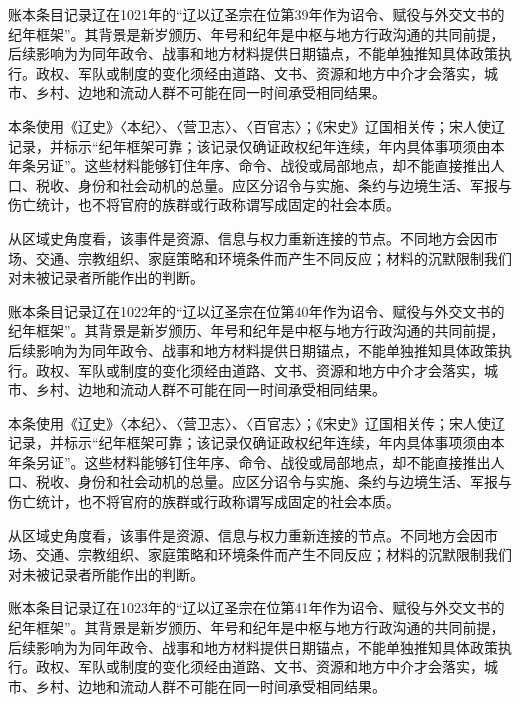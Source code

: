 账本条目记录辽在1021年的“辽以辽圣宗在位第39年作为诏令、赋役与外交文书的纪年框架”。其背景是新岁颁历、年号和纪年是中枢与地方行政沟通的共同前提，后续影响为为同年政令、战事和地方材料提供日期锚点，不能单独推知具体政策执行。政权、军队或制度的变化须经由道路、文书、资源和地方中介才会落实，城市、乡村、边地和流动人群不可能在同一时间承受相同结果。

本条使用《辽史》〈本纪〉、〈营卫志〉、〈百官志〉；《宋史》辽国相关传；宋人使辽记录，并标示“纪年框架可靠；该记录仅确证政权纪年连续，年内具体事项须由本年条另证”。这些材料能够钉住年序、命令、战役或局部地点，却不能直接推出人口、税收、身份和社会动机的总量。应区分诏令与实施、条约与边境生活、军报与伤亡统计，也不将官府的族群或行政称谓写成固定的社会本质。

从区域史角度看，该事件是资源、信息与权力重新连接的节点。不同地方会因市场、交通、宗教组织、家庭策略和环境条件而产生不同反应；材料的沉默限制我们对未被记录者所能作出的判断。

账本条目记录辽在1022年的“辽以辽圣宗在位第40年作为诏令、赋役与外交文书的纪年框架”。其背景是新岁颁历、年号和纪年是中枢与地方行政沟通的共同前提，后续影响为为同年政令、战事和地方材料提供日期锚点，不能单独推知具体政策执行。政权、军队或制度的变化须经由道路、文书、资源和地方中介才会落实，城市、乡村、边地和流动人群不可能在同一时间承受相同结果。

本条使用《辽史》〈本纪〉、〈营卫志〉、〈百官志〉；《宋史》辽国相关传；宋人使辽记录，并标示“纪年框架可靠；该记录仅确证政权纪年连续，年内具体事项须由本年条另证”。这些材料能够钉住年序、命令、战役或局部地点，却不能直接推出人口、税收、身份和社会动机的总量。应区分诏令与实施、条约与边境生活、军报与伤亡统计，也不将官府的族群或行政称谓写成固定的社会本质。

从区域史角度看，该事件是资源、信息与权力重新连接的节点。不同地方会因市场、交通、宗教组织、家庭策略和环境条件而产生不同反应；材料的沉默限制我们对未被记录者所能作出的判断。

账本条目记录辽在1023年的“辽以辽圣宗在位第41年作为诏令、赋役与外交文书的纪年框架”。其背景是新岁颁历、年号和纪年是中枢与地方行政沟通的共同前提，后续影响为为同年政令、战事和地方材料提供日期锚点，不能单独推知具体政策执行。政权、军队或制度的变化须经由道路、文书、资源和地方中介才会落实，城市、乡村、边地和流动人群不可能在同一时间承受相同结果。

